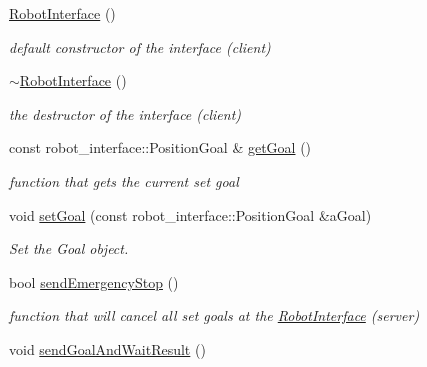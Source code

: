 \begin{DoxyCompactItemize}
\item 
\hyperlink{classMotionPlanner_1_1RobotInterface_a61a2523efbb0ed0085523926fb810e9a}{Robot\+Interface} ()\hypertarget{classMotionPlanner_1_1RobotInterface_a61a2523efbb0ed0085523926fb810e9a}{}\label{classMotionPlanner_1_1RobotInterface_a61a2523efbb0ed0085523926fb810e9a}

\begin{DoxyCompactList}\small\item\em default constructor of the interface (client) \end{DoxyCompactList}\item 
\hyperlink{classMotionPlanner_1_1RobotInterface_afc70551dc243a1738c7cf28660e1cae4}{$\sim$\+Robot\+Interface} ()\hypertarget{classMotionPlanner_1_1RobotInterface_afc70551dc243a1738c7cf28660e1cae4}{}\label{classMotionPlanner_1_1RobotInterface_afc70551dc243a1738c7cf28660e1cae4}

\begin{DoxyCompactList}\small\item\em the destructor of the interface (client) \end{DoxyCompactList}\item 
const robot\+\_\+interface\+::\+Position\+Goal \& \hyperlink{classMotionPlanner_1_1RobotInterface_ac73c12ffeb9c52850e443c80bc698b8f}{get\+Goal} ()
\begin{DoxyCompactList}\small\item\em function that gets the current set goal \end{DoxyCompactList}\item 
void \hyperlink{classMotionPlanner_1_1RobotInterface_a7a7f688819e70467b678050a6263840c}{set\+Goal} (const robot\+\_\+interface\+::\+Position\+Goal \&a\+Goal)
\begin{DoxyCompactList}\small\item\em Set the Goal object. \end{DoxyCompactList}\item 
bool \hyperlink{classMotionPlanner_1_1RobotInterface_a6b7487c9b48bac0d0718b2585fd51ba6}{send\+Emergency\+Stop} ()
\begin{DoxyCompactList}\small\item\em function that will cancel all set goals at the \hyperlink{classMotionPlanner_1_1RobotInterface}{Robot\+Interface} (server) \end{DoxyCompactList}\item 
void \hyperlink{classMotionPlanner_1_1RobotInterface_a601acf1e202577708b8335b3d0c53bf9}{send\+Goal\+And\+Wait\+Result} ()\hypertarget{classMotionPlanner_1_1RobotInterface_a601acf1e202577708b8335b3d0c53bf9}{}\label{classMotionPlanner_1_1RobotInterface_a601acf1e202577708b8335b3d0c53bf9}


\end{DoxyCompactItemize}
